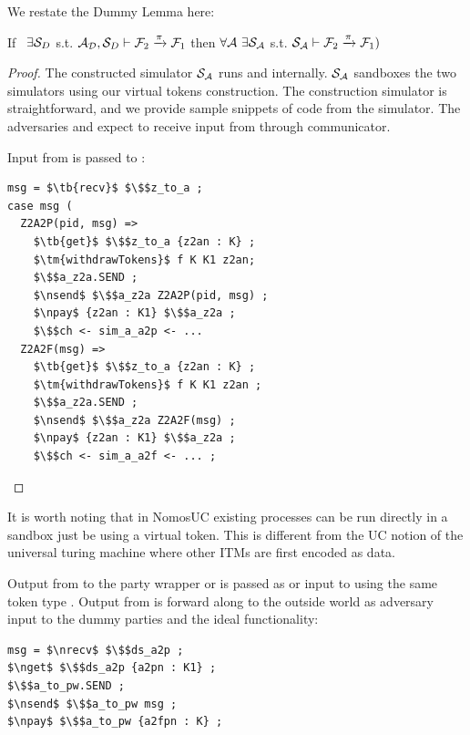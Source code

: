 We restate the Dummy Lemma here:
\begin{theorem}\label{thm:dummy}
If \ $\exists \mathcal{S}_{D}$ s.t. $ \mathcal{A}_\mathcal{D}, \mathcal{S}_{D} \vdash \mathcal{F}_2 \xrightarrow{\pi} \mathcal{F}_1$ then $\forall \mathcal{A} \ \exists \mathcal{S}_\mathcal{A}$ s.t. $\mathcal{S}_{\mathcal{A}} \vdash  \mathcal{F}_2 \xrightarrow{\pi} \mathcal{F}_1)$ 
\end{theorem}

\begin{proof}
The constructed simulator $\mathcal{S}_\mathcal{A}$ runs \A and \DS internally.
$\mathcal{S}_\mathcal{A}$ sandboxes the two simulators using our virtual tokens construction.
The construction simulator is straightforward, and we provide sample snippets of code from the simulator.
The adversaries \A and \DS expect to receive input from \Z through communicator.

Input from \Z is passed to \A:
\begin{lstlisting}[basicstyle=\footnotesize\BeraMonottFamily, frame=single,  mathescape]
msg = $\tb{recv}$ $\$$z_to_a ;
case msg (
  Z2A2P(pid, msg) =>
    $\tb{get}$ $\$$z_to_a {z2an : K} ;
    $\tm{withdrawTokens}$ f K K1 z2an;
    $\$$a_z2a.SEND ;
    $\nsend$ $\$$a_z2a Z2A2P(pid, msg) ;
    $\npay$ {z2an : K1} $\$$a_z2a ;
    $\$$ch <- sim_a_a2p <- ... 
  Z2A2F(msg) =>
    $\tb{get}$ $\$$z_to_a {z2an : K} ;
    $\tm{withdrawTokens}$ f K K1 z2an ;
    $\$$a_z2a.SEND ;
    $\nsend$ $\$$a_z2a Z2A2F(msg) ;
    $\npay$ {z2an : K1} $\$$a_z2a ;
    $\$$ch <- sim_a_a2f <- ... ;
\end{lstlisting}
\end{proof}
It is worth noting that in NomosUC existing processes can be run directly in a sandbox just be using a virtual token.
This is different from the UC notion of the universal turing machine where other ITMs are first encoded as data.

Output from \A to the party wrapper or \F is passed as  or  input to \DS using the same token type .
Output from \DS is forward along to the outside world as adversary input to the dummy parties and the ideal functionality:
\begin{lstlisting}[basicstyle=\footnotesize\BeraMonottFamily, frame=single, mathescape]
msg = $\nrecv$ $\$$ds_a2p ;
$\nget$ $\$$ds_a2p {a2pn : K1} ;
$\$$a_to_pw.SEND ;
$\nsend$ $\$$a_to_pw msg ;
$\npay$ $\$$a_to_pw {a2fpn : K} ;
\end{lstlisting}
